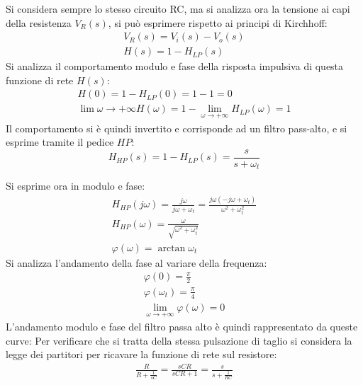 \documentclass{article}
\numberwithin{equation}{subsection}
\begin{document}
Si considera sempre lo stesso circuito RC, ma si analizza ora la tensione ai capi della resistenza $V_R(s)$, si può esprimere rispetto ai principi di Kirchhoff:
\begin{gather*}
    V_R(s)=V_i(s)-V_o(s)\\
    H(s)=1-H_{LP}(s)
\end{gather*}
Si analizza il comportamento modulo e fase della risposta impulsiva di questa funzione di rete $H(s)$: 
\begin{gather*}
    H(0)=1-H_{LP}(0)=1-1=0\\
    \lim{\omega\to+\infty}H(\omega)=1-\lim_{\omega\to+\infty}H_{LP}(\omega)=1
\end{gather*}
Il comportamento si è quindi invertito e corrisponde ad un filtro pass-alto, e si esprime tramite il pedice $HP$:
\begin{equation}
    H_{HP}(s)=1-H_{LP}(s)=\displaystyle\frac{s}{s+\omega_t}
\end{equation}

Si esprime ora in modulo e fase:
\begin{gather*}
    H_{HP}(j\omega)=\displaystyle\frac{j\omega}{j\omega+\omega_t}=\frac{j\omega(-j\omega+\omega_t)}{\omega^2+\omega_t^2}\\
    H_{HP}(\omega)=\displaystyle\frac{\omega}{\sqrt{\omega^2+\omega_t^2}}\\
    \varphi(\omega)=\arctan\omega_t
\end{gather*}
Si analizza l'andamento della fase al variare della frequenza:
\begin{gather*}
    \varphi(0)=\displaystyle\frac{\pi}{2}\\
    \varphi(\omega_t)=\displaystyle\frac{\pi}{4}\\
    \lim_{\omega\to+\infty}\varphi(\omega)=0
\end{gather*}
L'andamento modulo e fase del filtro passa alto è quindi rappresentato da queste curve: 
Per verificare che si tratta della stessa pulsazione di taglio si considera la legge dei partitori per ricavare la funzione di rete sul resistore:
\begin{gather*}
    \displaystyle\frac{R}{R+\displaystyle\frac{1}{sC}}=\frac{sCR}{sCR+1}=\frac{s}{s+\displaystyle\frac{1}{RC}}
\end{gather*}
\end{document}
